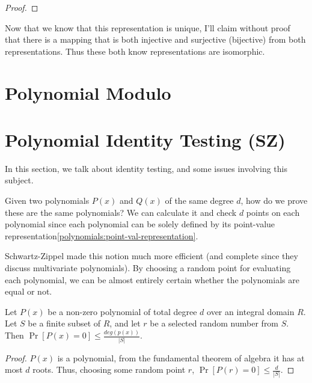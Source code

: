 \begin{proof}
\end{proof}

Now that we know that this representation is unique, I'll claim without proof that
there is a mapping that is both injective and surjective (bijective) from both representations.
Thus these both know representations are isomorphic.

\section{Polynomial Modulo}
\section{Polynomial Identity Testing (SZ)}\label{schawtz-zippel}
In this section, we talk about identity testing, 
and some issues involving this subject.

Given two polynomials $P(x)$ and $Q(x)$ of the same degree $d$, 
how do we prove these are the same polynomials?
We can calculate it and check $d$ points on each polynomial 
since each polynomial can be solely defined by its point-value representation\ref{polynomials:point-val-representation}.


Schwartz-Zippel \cite{SZ} made this notion much more efficient 
(and complete since they discuss multivariate polynomials).
By choosing a random point for evaluating each polynomial, we can 
be almost entirely certain 
whether the polynomials are equal or not.

\begin{theorem}
 Let $P(x)$ be a non-zero polynomial of total degree $d$ over 
 an integral domain $R$. Let $S$ be a finite subset of $R$, and let $r$
 be a selected random number from $S$. Then
  $\Pr [P(x)=0]\le \frac{deg(p(x))}{|S|}$.
\end{theorem}
\begin{proof}
  $P(x)$ is a polynomial, from the fundamental theorem of algebra\cite{Aigner2010} it has 
 at most $d$ roots. Thus, choosing some random point $r$,
  $\Pr [P(r)=0]\le \frac{d}{|S|}$. 
\end{proof}


